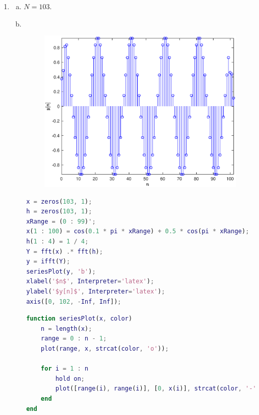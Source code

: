 \documentclass{article}
\begin{document}
\begin{enumerate}
            \item 
            \begin{enumerate}[(a)]
                \item $N = 103$.
                \item \ 
                \vspace{-1em}
                \begin{figure}[htbp]
                    \centering
                    \includegraphics[width = .6\textwidth]{fig/fft}
                \end{figure}
            \end{enumerate}	
            \begin{lstlisting}[language = matlab]
    % matlab script
    x = zeros(103, 1);
    h = zeros(103, 1);
    xRange = (0 : 99)';
    x(1 : 100) = cos(0.1 * pi * xRange) + 0.5 * cos(pi * xRange);
    h(1 : 4) = 1 / 4;
    Y = fft(x) .* fft(h);
    y = ifft(Y);
    seriesPlot(y, 'b');
    xlabel('$n$', Interpreter='latex');
    ylabel('$y[n]$', Interpreter='latex');
    axis([0, 102, -Inf, Inf]);
            \end{lstlisting}
            \begin{lstlisting}[language = matlab]
    % matlab function
    function seriesPlot(x, color)
        n = length(x);
        range = 0 : n - 1;
        plot(range, x, strcat(color, 'o'));
        
        for i = 1 : n
            hold on;
            plot([range(i), range(i)], [0, x(i)], strcat(color, '-'));
        end
    end
            \end{lstlisting}


\end{enumerate}
\end{document}
